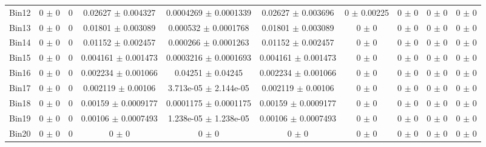 \begin{tabular}{@{\extracolsep{4pt}}lccccccccc@{}}
     Bin12 & 0 $\pm$ 0 & 0 & 0.02627 $\pm$ 0.004327 & 0.0004269 $\pm$ 0.0001339 & 0.02627 $\pm$ 0.003696 & 0 $\pm$ 0.00225 & 0 $\pm$ 0 & 0 $\pm$ 0 & 0 $\pm$ 0 \\ 
     Bin13 & 0 $\pm$ 0 & 0 & 0.01801 $\pm$ 0.003089 & 0.000532 $\pm$ 0.0001768 & 0.01801 $\pm$ 0.003089 & 0 $\pm$ 0 & 0 $\pm$ 0 & 0 $\pm$ 0 & 0 $\pm$ 0 \\ 
     Bin14 & 0 $\pm$ 0 & 0 & 0.01152 $\pm$ 0.002457 & 0.000266 $\pm$ 0.0001263 & 0.01152 $\pm$ 0.002457 & 0 $\pm$ 0 & 0 $\pm$ 0 & 0 $\pm$ 0 & 0 $\pm$ 0 \\ 
     Bin15 & 0 $\pm$ 0 & 0 & 0.004161 $\pm$ 0.001473 & 0.0003216 $\pm$ 0.0001693 & 0.004161 $\pm$ 0.001473 & 0 $\pm$ 0 & 0 $\pm$ 0 & 0 $\pm$ 0 & 0 $\pm$ 0 \\ 
     Bin16 & 0 $\pm$ 0 & 0 & 0.002234 $\pm$ 0.001066 & 0.04251 $\pm$ 0.04245 & 0.002234 $\pm$ 0.001066 & 0 $\pm$ 0 & 0 $\pm$ 0 & 0 $\pm$ 0 & 0 $\pm$ 0 \\ 
     Bin17 & 0 $\pm$ 0 & 0 & 0.002119 $\pm$ 0.00106 & 3.713e-05 $\pm$ 2.144e-05 & 0.002119 $\pm$ 0.00106 & 0 $\pm$ 0 & 0 $\pm$ 0 & 0 $\pm$ 0 & 0 $\pm$ 0 \\ 
     Bin18 & 0 $\pm$ 0 & 0 & 0.00159 $\pm$ 0.0009177 & 0.0001175 $\pm$ 0.0001175 & 0.00159 $\pm$ 0.0009177 & 0 $\pm$ 0 & 0 $\pm$ 0 & 0 $\pm$ 0 & 0 $\pm$ 0 \\ 
     Bin19 & 0 $\pm$ 0 & 0 & 0.00106 $\pm$ 0.0007493 & 1.238e-05 $\pm$ 1.238e-05 & 0.00106 $\pm$ 0.0007493 & 0 $\pm$ 0 & 0 $\pm$ 0 & 0 $\pm$ 0 & 0 $\pm$ 0 \\ 
     Bin20 & 0 $\pm$ 0 & 0 & 0 $\pm$ 0 & 0 $\pm$ 0 & 0 $\pm$ 0 & 0 $\pm$ 0 & 0 $\pm$ 0 & 0 $\pm$ 0 & 0 $\pm$ 0 \\ 
\hline\hline
  \end{tabular}
